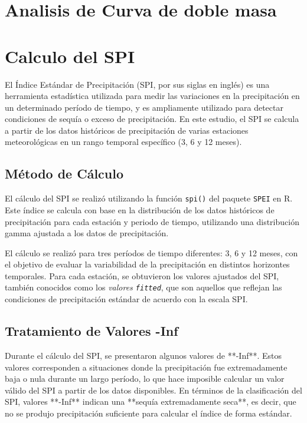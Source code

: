 \section{Analisis de Curva de doble masa}




\section{Calculo del SPI}


El Índice Estándar de Precipitación (SPI, por sus siglas en inglés) es una herramienta estadística utilizada para medir las variaciones en la precipitación en un determinado período de tiempo, y es ampliamente utilizado para detectar condiciones de sequía o exceso de precipitación. En este estudio, el SPI se calcula a partir de los datos históricos de precipitación de varias estaciones meteorológicas en un rango temporal específico (3, 6 y 12 meses).

\subsection{Método de Cálculo}

El cálculo del SPI se realizó utilizando la función \texttt{spi()} del paquete \texttt{SPEI} en R. Este índice se calcula con base en la distribución de los datos históricos de precipitación para cada estación y periodo de tiempo, utilizando una distribución gamma ajustada a los datos de precipitación.

El cálculo se realizó para tres períodos de tiempo diferentes: 3, 6 y 12 meses, con el objetivo de evaluar la variabilidad de la precipitación en distintos horizontes temporales. Para cada estación, se obtuvieron los valores ajustados del SPI, también conocidos como los \textit{valores \texttt{fitted}}, que son aquellos que reflejan las condiciones de precipitación estándar de acuerdo con la escala SPI.

\subsection{Tratamiento de Valores -Inf}

Durante el cálculo del SPI, se presentaron algunos valores de **-Inf**. Estos valores corresponden a situaciones donde la precipitación fue extremadamente baja o nula durante un largo período, lo que hace imposible calcular un valor válido del SPI a partir de los datos disponibles. En términos de la clasificación del SPI, valores **-Inf** indican una **sequía extremadamente seca**, es decir, que no se produjo precipitación suficiente para calcular el índice de forma estándar.

